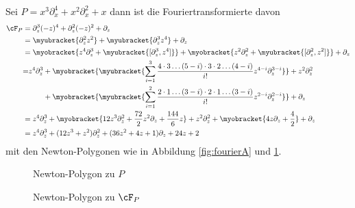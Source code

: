 \begin{exmp}
Sei $P=x^3\partial_x^4+x^2\partial_x^2+x$ dann ist die Fouriertransformierte
davon
\begin{align*}
\cF_P&=\partial_z^3(-z)^4+\partial_z^2(-z)^2+\partial_z
\\&=\myubracket{\partial_z^2z^2} + \myubracket{\partial_z^3z^4}+\partial_z
\\&=\myobracket{z^4\partial_z^3 + \myubracket{[\partial_z^3,z^4]}}
  + \myobracket{z^2\partial_z^2 + \myubracket{[\partial_z^2,z^2]}}
  + \partial_z
\\&\begin{aligned}
  =&z^4\partial_z^3 + \myobracket{\myubracket{
    \sum_{i=1}^3\frac{4\cdot3\dots(5-i)\cdot 3 \cdot 2  \dots
    (4-i)}{i!}z^{4-i}\partial_z^{3-i}
  }} + z^2\partial_z^2
\\&\qquad+ \myobracket{\myubracket{
    \sum_{i=1}^2\frac{2\cdot1\dots(3-i)\cdot 2 \cdot 1  \dots
    (3-i)}{i!}z^{2-i}\partial_z^{2-i}
  }}
  + \partial_z
\end{aligned}
\\&=z^4\partial_z^3 + \myobracket{
    12z^3\partial_z^2 + \frac{72}{2}z^2\partial_z + \frac{144}{6}z
  }
  + z^2\partial_z^2 + \myobracket{ 4z\partial_z + \frac{4}{2} } + \partial_z
\\&=z^4\partial_z^3
  + (12z^3 + z^2)\partial_z^2
  + (36z^2 + 4z + 1)\partial_z
  + 24z + 2
\end{align*}
mit den Newton-Polygonen wie in Abbildung \ref{fig:fourierA} und
\ref{fig:fourierB}.
\begin{figure}[htbp]
  \begin{minipage}[hbt]{0,49\textwidth}
  \begin{center}
  \end{center}
  \caption{Newton-Polygon zu $P$}
    \label{fig:fourierA}
  \end{minipage}
  \begin{minipage}[hbt]{0,49\textwidth}
  \begin{center}
  \end{center}
  \caption{Newton-Polygon zu $\cF_P$}
    \label{fig:fourierB}
  \end{minipage}
\end{figure}
\end{exmp}

